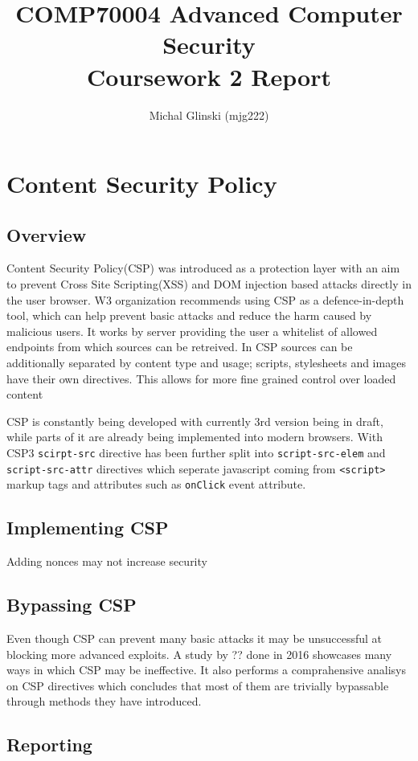 \documentclass[11]{article}   %
\begin{document}
\title{COMP70004 Advanced Computer Security\\Coursework 2 Report} 
\author{Michal Glinski (mjg222)}    

\maketitle

\section{Content Security Policy}
\subsection{Overview}
Content Security Policy(CSP) was introduced as a protection layer with an aim to prevent Cross Site Scripting(XSS) and DOM injection based attacks directly in the user browser.
W3 organization recommends using CSP as a defence-in-depth tool, which can help prevent basic attacks and reduce the harm caused by malicious users.
It works by server providing the user a whitelist of allowed endpoints from which sources can be retreived.
In CSP sources can be additionally separated by content type and usage; scripts, stylesheets and images have their own directives. 
This allows for more fine grained control over loaded content

CSP is constantly being developed with currently 3rd version being in draft, while parts of it are already being implemented into modern browsers.
With CSP3 \texttt{scirpt-src} directive has been further split into \texttt{script-src-elem} and \texttt{script-src-attr} directives which seperate javascript coming from \texttt{<script>} markup tags and attributes such as \texttt{onClick} event attribute.

\subsection{Implementing CSP}

Adding nonces may not increase security

\subsection{Bypassing CSP}
Even though CSP can prevent many basic attacks it may be unsuccessful at blocking more advanced exploits.
A study by ?? \cite{??} done in 2016 showcases many ways in which CSP may be ineffective. 
It also performs a comprahensive analisys on CSP directives which concludes that most of them are trivially bypassable through methods they have introduced.



\subsection{Reporting}
\end{document}
